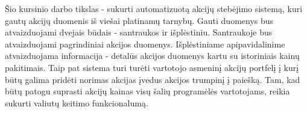 Šio kursinio darbo tikslas - sukurti automatizuotą akcijų stebėjimo sistemą, kuri gautų akcijų duomenis iš viešai platinamų tarnybų. Gauti duomenys bus atvaizduojami dvejais būdais - santraukos ir išplėstiniu. Santraukoje bus atvaizduojami pagrindiniai akcijos duomenys. Išplėstiniame apipavidalinime atvaizduojama informacija - detalūs akcijos duomenys kartu su istoriniais kainų pakitimais. Taip pat sistema turi turėti vartotojo asmeninį akcijų portfelį į kurį būtų galima pridėti norimas akcijas įvedus akcijos trumpinį į paiešką. Tam, kad būtų patogu suprasti akcijų kainas visų šalių programėlės vartotojams, reikia sukurti valiutų keitimo funkcionalumą.